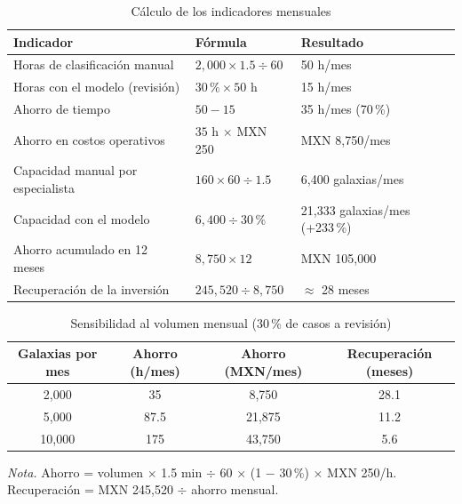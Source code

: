 \documentclass[letterpaper,11pt]{article}
\newcommand{\nota}[1]{{\footnotesize\textit{Nota.} #1\par}}
\begin{document}
\begin{table}[!ht]
\caption{Cálculo de los indicadores mensuales}
\small
\begin{tabular}{@{}p{5.5cm}p{4cm}p{6cm}@{}}
\toprule
Indicador & Fórmula & Resultado\\
\midrule
Horas de clasificación manual & $2{,}000 \times 1.5 \div 60$ & 50 h/mes\\
Horas con el modelo (revisión) & $30\,\% \times 50$ h & 15 h/mes\\
Ahorro de tiempo & $50 - 15$ & 35 h/mes (70\,\%)\\
Ahorro en costos operativos & $35$ h $\times$ MXN 250 & MXN 8,750/mes\\
Capacidad manual por especialista & $160 \times 60 \div 1.5$ & 6,400 galaxias/mes\\
Capacidad con el modelo & $6{,}400 \div 30\,\%$ & 21,333 galaxias/mes (+233\,\%)\\
Ahorro acumulado en 12 meses & $8{,}750 \times 12$ & MXN 105,000\\
Recuperación de la inversión & $245{,}520 \div 8{,}750$ & $\approx$ 28 meses\\
\bottomrule
\end{tabular}
\end{table}

\begin{table}[!ht]
\caption{Sensibilidad al volumen mensual (30\,\% de casos a revisión)}
\small
\centering
\begin{tabular}{cccc}
\toprule
Galaxias por mes & Ahorro (h/mes) & Ahorro (MXN/mes) & Recuperación (meses)\\
\midrule
2,000 & 35 & 8,750 & 28.1\\
5,000 & 87.5 & 21,875 & 11.2\\
10,000 & 175 & 43,750 & 5.6\\
\bottomrule
\end{tabular}
\nota{Ahorro = volumen $\times$ 1.5 min $\div$ 60 $\times$ (1 $-$ 30\,\%) $\times$ MXN 250/h. Recuperación = MXN 245,520 $\div$ ahorro mensual.}
\end{table}
\end{document}
